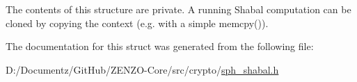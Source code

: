 The contents of this structure are private. A running Shabal computation can be cloned by copying the context (e.\+g. with a simple {\ttfamily memcpy()}). 

The documentation for this struct was generated from the following file\+:\begin{DoxyCompactItemize}
\item 
D\+:/\+Documentz/\+Git\+Hub/\+Z\+E\+N\+Z\+O-\/\+Core/src/crypto/\mbox{\hyperlink{sph__shabal_8h}{sph\+\_\+shabal.\+h}}\end{DoxyCompactItemize}

